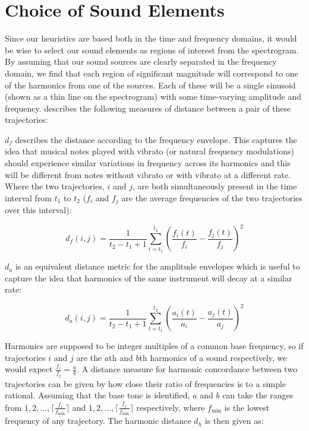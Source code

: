 \documentclass[12pt,a4paper,twoside,openright]{report}
\begin{document}
\section{Choice of Sound Elements}

Since our heuristics are based both in the time and frequency domains, it would be wise to select our sound elements as regions of interest from the spectrogram. By assuming that our sound sources are clearly separated in the frequency domain, we find that each region of significant magnitude will correspond to one of the harmonics from one of the sources. Each of these will be a single sinusoid (shown as a thin line on the spectrogram) with some time-varying amplitude and frequency. \cite{virtanen2000separation} describes the following measures of distance between a pair of these trajectories:

$ d_f $ describes the distance according to the frequency envelope. This captures the idea that musical notes played with vibrato (or natural frequency modulations) should experience similar variations in frequency across its harmonics and this will be different from notes without vibrato or with vibrato at a different rate. Where the two trajectories, $ i $ and $ j $, are both simultaneously present in the time interval from $ t_1 $ to $ t_2 $ ($ f_i $ and $ f_j $ are the average frequencies of the two trajectories over this interval):

\begin{equation}
d_f(i,j) = \frac{1}{t_2 - t_1 + 1} \sum_{t = t_1}^{t_2} \left( \frac{f_i(t)}{f_i} - \frac{f_j(t)}{f_j} \right)^2
\label{sinDf}
\end{equation}

$ d_a $ is an equivalent distance metric for the amplitude envelopes which is useful to capture the idea that harmonics of the same instrument will decay at a similar rate:

\begin{equation}
d_a(i,j) = \frac{1}{t_2 - t_1 + 1} \sum_{t = t_1}^{t_2} \left( \frac{a_i(t)}{a_i} - \frac{a_j(t)}{a_j} \right)^2
\label{sinDa}
\end{equation}

Harmonics are supposed to be integer multiples of a common base frequency, so if trajectories $ i $ and $ j $ are the $ a $th and $ b $th harmonics of a sound respectively, we would expect $ \frac{f_i}{f_j} = \frac{a}{b} $. A distance measure for harmonic concordance between two trajectories can be given by how close their ratio of frequencies is to a simple rational. Assuming that the base tone is identified, $ a $ and $ b $ can take the ranges from $ 1, 2, \ldots, \lceil \frac{f_i}{f_{\mathrm{min}}} \rceil $ and $ 1, 2, \ldots, \lceil \frac{f_j}{f_{\mathrm{min}}} \rceil $ respectively, where $ f_{\mathrm{min}} $ is the lowest frequency of any trajectory. The harmonic distance $ d_h $ is then given as:
\end{document}
